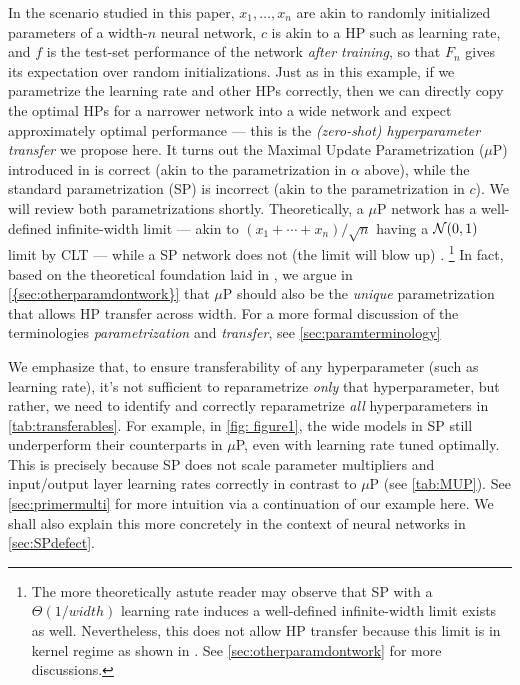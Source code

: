 \documentclass{article}
\theoremstyle{definition}
\begin{document}
In the scenario studied in this paper, $x_{1},\ldots,x_{n}$ are akin
to randomly initialized parameters of a width-$n$ neural network,
$c$ is akin to a HP such as learning rate, and $f$ is
the test-set performance of the network \emph{after training}, so
that $F_{n}$ gives its expectation over random initializations. Just
as in this example, if we parametrize the learning rate and other
HPs correctly, then we can directly copy the optimal HPs
for a narrower network into a wide network and expect approximately
optimal performance --- this is the \emph{(zero-shot) hyperparameter transfer}
we propose here. It turns out the Maximal Update Parametrization ($\mu$P)
introduced in \cite{TP4} is correct (akin to the parametrization
in $\alpha$ above), while the standard parametrization (SP) is incorrect
(akin to the parametrization in $c$).
We will review both parametrizations shortly.
Theoretically, a $\mu$P network has a well-defined infinite-width limit  --- akin to $(x_1 + \cdots + x_n)/\sqrt n$ having a $\mathcal{N}(0, 1)$ limit by CLT --- while a SP network does not (the limit will blow up) \citep{TP4}.%
\footnote{The more theoretically astute reader may observe that SP with a $\Theta(1/width)$ learning rate induces a well-defined infinite-width limit exists as well.
Nevertheless, this does not allow HP transfer because this limit is in kernel regime as shown in \citep{TP4}.
See \cref{sec:otherparamdontwork} for more discussions.}
In fact, based on the theoretical foundation laid in \citep{TP4},  we argue in \cref{{sec:otherparamdontwork}} that $\mu$P should also be the \emph{unique} parametrization that allows HP transfer across width.
For a more formal discussion of the terminologies \emph{parametrization} and \emph{transfer}, see \cref{sec:paramterminology}

We emphasize that, to ensure transferability of any hyperparameter (such as learning rate), it's not sufficient to reparametrize \emph{only} that hyperparameter, but rather, we need to identify and correctly reparametrize \emph{all} hyperparameters in \cref{tab:transferables}.
For example, in \cref{fig: figure1}, the wide models in SP still underperform their counterparts in $\mu$P, even with learning rate tuned optimally.
This is precisely because SP does not scale parameter multipliers and input/output layer learning rates correctly in contrast to $\mu$P (see \cref{tab:MUP}).
See \cref{sec:primermulti} for more intuition via a continuation of our example here.
We shall also explain this more concretely in the context of neural networks in \cref{sec:SPdefect}.
\end{document}
